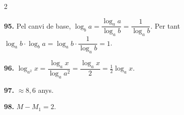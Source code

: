 \documentclass[13pt,a4paper]{extarticle}
\begin{document}
\begin{multicols}{2}
\begin{minipage}{\linewidth}
\end{minipage}\par\vspace{1.6mm}
\par\noindent\begin{minipage}{\linewidth}
\textbf{95.} Pel canvi de base, $\log_b a=\dfrac{\log_a a}{\log_a b}=\dfrac{1}{\log_a b}$. Per tant $\log_a b\cdot\log_b a=\log_a b\cdot\dfrac{1}{\log_a b}=1$.\par
\end{minipage}\par\vspace{1.6mm}
\par\noindent\begin{minipage}{\linewidth}
\textbf{96.} $\log_{a^2}x=\dfrac{\log_a x}{\log_a a^2}=\dfrac{\log_a x}{2}=\tfrac12\log_a x$.\par
\end{minipage}\par\vspace{1.6mm}
\par\noindent\begin{minipage}{\linewidth}
\textbf{97.} $\approx8{,}6$ anys.\par
\end{minipage}\par\vspace{1.6mm}
\par\noindent\begin{minipage}{\linewidth}
\textbf{98.} $M-M_1=2$.\par


\end{minipage}
\end{multicols}
\end{document}
